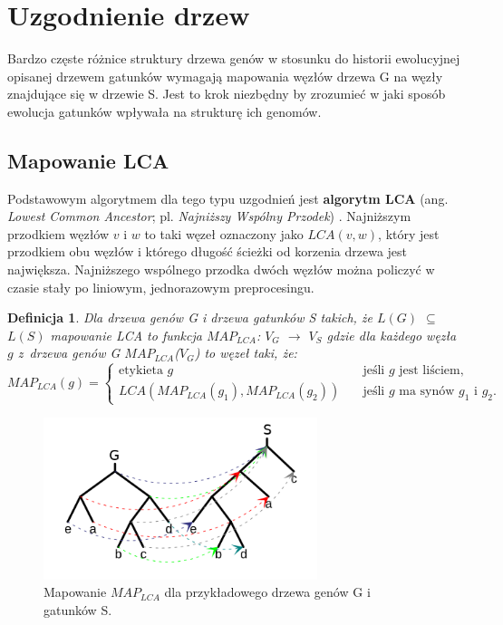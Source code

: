 \documentclass[licencjacka]{pracamgr}
\newtheorem{defi}{Definicja}[section]
\begin{document}
\section{Uzgodnienie drzew}
Bardzo częste różnice struktury drzewa genów w stosunku do historii ewolucyjnej opisanej drzewem gatunków wymagają mapowania węzłów drzewa G na węzły znajdujące się w drzewie S. Jest to krok niezbędny by zrozumieć w jaki sposób ewolucja gatunków wpływała na strukturę ich genomów. 

\subsection{Mapowanie LCA}
Podstawowym algorytmem dla tego typu uzgodnień jest \textbf{algorytm LCA} (ang. \textit{Lowest Common Ancestor}; pl. \textit{Najniższy Wspólny Przodek}) \cite{lca}. Najniższym przodkiem węzłów $v$ i $w$ to taki węzeł oznaczony jako $LCA(v,w)$, który jest przodkiem obu węzłów i którego długość ścieżki od korzenia drzewa jest największa. Najniższego wspólnego przodka dwóch węzłów można policzyć w czasie stały po liniowym, jednorazowym preprocesingu. 

\begin{defi}
Dla drzewa genów G i drzewa gatunków S takich, że $L(G)$ $\subseteq$ $L(S)$ mapowanie LCA to funkcja $MAP_{LCA}$: $V_G$ $\rightarrow$ $V_S$ gdzie dla każdego węzła $g$ z~drzewa genów G $MAP_{LCA}$($V_G$) to węzeł taki, że:
\[ MAP_{LCA}(g) =
  \begin{cases}
    \text{etykieta }g       & \quad \text{jeśli } g \text{ jest liściem,}\\
    LCA(MAP_{LCA}(g_1),MAP_{LCA}(g_2))  & \quad \text{jeśli } g \text{ ma synów } g_1 \text{ i } g_2.
  \end{cases}
\]
\end{defi}

\begin{figure}[H]
  \centering
  \includegraphics[width=80mm]{./pictures/mapping.png}
  \caption{Mapowanie $MAP_{LCA}$ dla przykładowego drzewa genów G i gatunków S.}
\end{figure}
\end{document}
